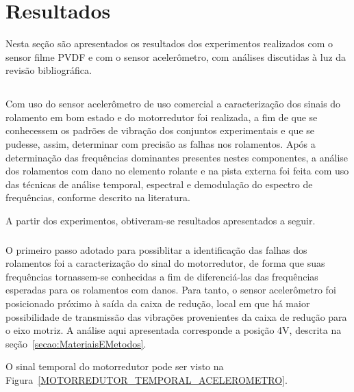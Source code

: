 \documentclass[
	12pt,				
	oneside,			
	a4paper,			
	english,			
	brazil,			
	]{abntex2ppgsi}
\begin{document}
\chapter{Resultados}

Nesta seção são apresentados os resultados dos experimentos realizados com o sensor filme PVDF e com o sensor acelerômetro, com análises discutidas à luz da revisão bibliográfica. 

\section{}

Com uso do sensor acelerômetro de uso comercial a caracterização dos sinais do rolamento em bom estado e do motorredutor foi realizada, a fim de que se conhecessem os padrões de vibração dos conjuntos experimentais e que se pudesse, assim, determinar com precisão as falhas nos rolamentos. Após a determinação das frequências dominantes presentes nestes componentes, a análise dos rolamentos com dano no elemento rolante e na pista externa foi feita com uso das técnicas de análise temporal, espectral e demodulação do espectro de frequências, conforme descrito na literatura.

A partir dos experimentos, obtiveram-se resultados apresentados a seguir.

\subsection{}

O primeiro passo adotado para possiblitar a identificação das falhas dos rolamentos foi a caracterização do sinal do motorredutor, de forma que suas frequências tornassem-se conhecidas a fim de diferenciá-las das frequências esperadas para os rolamentos com danos. Para tanto, o sensor acelerômetro foi posicionado próximo à saída da caixa de redução, local em que há maior possibilidade de transmissão das vibrações provenientes da caixa de redução para o eixo motriz. A análise aqui apresentada corresponde a posição 4V, descrita na seção~\ref{secao:MateriaisEMetodos}.

O sinal temporal do motorredutor pode ser visto na Figura~\ref{MOTORREDUTOR_TEMPORAL_ACELEROMETRO}.
\end{document}
